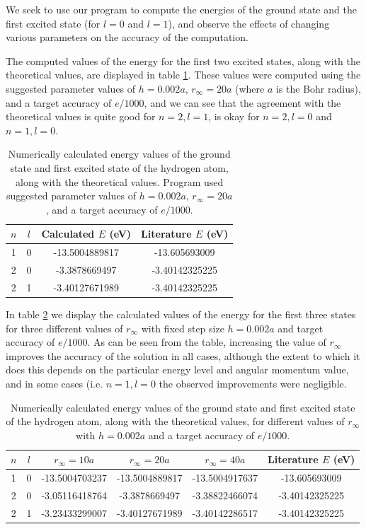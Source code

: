 \documentclass{article}
\begin{document}
We seek to use our program to compute the energies of the ground state and the first excited state (for $l=0$ and $l=1$), and observe the effects of changing various parameters on the accuracy of the computation.

The computed values of the energy for the first two excited states, along with the theoretical values, are displayed in table \ref{tab:2b_i}. These values were computed using the suggested parameter values of $h=0.002a$, $r_\infty=20a$ (where $a$ is the Bohr radius), and a target accuracy of $e/1000$, and we can see that the agreement with the theoretical values is quite good for $n=2, l=1$, is okay for $n=2, l=0$ and $n=1, l=0$.

\begin{table}[H]
	\centering
	\caption{Numerically calculated energy values of the ground state and first excited state of the hydrogen atom, along with the theoretical values. Program used suggested parameter values of $h=0.002a$, $r_\infty=20a$, and a target accuracy of $e/1000$.}
	\label{tab:2b_i}
	\begin{tabular}{c|c|c|c}
		$n$ & $l$ & Calculated $E$ (eV)  & Literature $E$ (eV) \\
		\hline
		1 & 0 & -13.5004889817 & -13.605693009 \\
		2 & 0 & -3.3878669497 & -3.40142325225 \\
		2 & 1 & -3.40127671989 & -3.40142325225 \\
	\end{tabular}
\end{table}

In table \ref{tab:2b_ii} we display the calculated values of the energy for the first three states for three different values of $r_\infty$ with fixed step size $h=0.002a$ and target accuracy of $e/1000$. As can be seen from the table, increasing the value of $r_\infty$ improves the accuracy of the solution in all cases, although the extent to which it does this depends on the particular energy level and angular momentum value, and in some cases (i.e. $n=1, l=0$ the observed improvements were negligible.

\begin{table}[H]
	\centering
	\caption{Numerically calculated energy values of the ground state and first excited state of the hydrogen atom, along with the theoretical values, for different values of $r_\infty$ with $h=0.002a$ and a target accuracy of $e/1000$.}
	\label{tab:2b_ii}
	\begin{tabular}{c|c|c|c|c|c}
		$n$ & $l$ & $r_\infty=10a$ &  $r_\infty=20a$ & $r_\infty=40a$ & Literature $E$ (eV) \\
		\hline
		1 & 0 & -13.5004703237 & -13.5004889817 & -13.5004917637 & -13.605693009 \\
		2 & 0 & -3.05116418764 & -3.3878669497 & -3.38822466074 &  -3.40142325225 \\
		2 & 1 & -3.23433299007 & -3.40127671989 & -3.40142286517 & -3.40142325225 \\
	\end{tabular}
\end{table}
\end{document}
